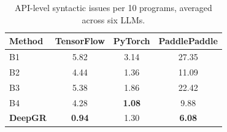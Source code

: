 \begin{table}[t]
    \caption{API-level syntactic issues per 10 programs,
    averaged across six LLMs.}
    \label{tab:api_issues}
    \centering
    \small
    \setlength{\tabcolsep}{5pt}
    \begin{tabular}{lccc}
    \toprule
    Method & TensorFlow & PyTorch & PaddlePaddle \\
    \midrule
    B1 & 5.82 & 3.14 & 27.35 \\
    B2 & 4.44 & 1.36 & 11.09 \\
    B3 & 5.38 & 1.86 & 22.42 \\
    B4 & 4.28 & \textbf{1.08} & 9.88 \\
    \textbf{DeepGR}
    & \textbf{0.94} & 1.30 & \textbf{6.08} \\
    \bottomrule
    \end{tabular}
\end{table}